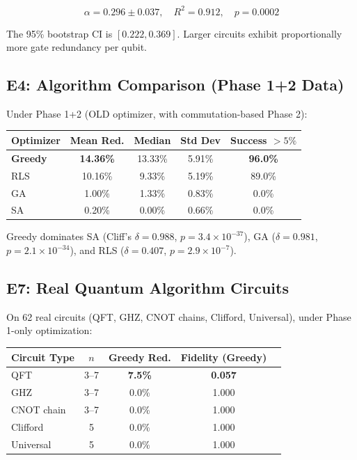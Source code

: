 \documentclass[aps,preprint,secnum,lined]{revtex4-2}
\begin{document}
\begin{equation}
\alpha = 0.296 \pm 0.037, \quad R^2 = 0.912, \quad p = 0.0002
\end{equation}

The 95\% bootstrap CI is $[0.222, 0.369]$. Larger circuits exhibit proportionally more gate redundancy per qubit.

\subsection{E4: Algorithm Comparison (Phase 1+2 Data)}
Under Phase 1+2 (OLD optimizer, with commutation-based Phase 2):

\begin{center}
\begin{tabular}{lcccc}
Optimizer & Mean Red. & Median & Std Dev & Success $>5\%$ \\ \hline
\textbf{Greedy} & \textbf{14.36\%} & 13.33\% & 5.91\% & \textbf{96.0\%} \\
RLS & 10.16\% & 9.33\% & 5.19\% & 89.0\% \\
GA & 1.00\% & 1.33\% & 0.83\% & 0.0\% \\
SA & 0.20\% & 0.00\% & 0.66\% & 0.0\%
\end{tabular}
\end{center}

Greedy dominates SA (Cliff's $\delta = 0.988$, $p = 3.4\times10^{-37}$), GA ($\delta = 0.981$, $p = 2.1\times10^{-34}$), and RLS ($\delta = 0.407$, $p = 2.9\times10^{-7}$).

\subsection{E7: Real Quantum Algorithm Circuits}
On 62 real circuits (QFT, GHZ, CNOT chains, Clifford, Universal), under Phase 1-only optimization:

\begin{center}
\begin{tabular}{lcccc}
Circuit Type & $n$ & Greedy Red. & Fidelity (Greedy) \\ \hline
QFT & 3--7 & \textbf{7.5\%} & \textbf{0.057} \\
GHZ & 3--7 & 0.0\% & 1.000 \\
CNOT chain & 3--7 & 0.0\% & 1.000 \\
Clifford & 5 & 0.0\% & 1.000 \\
Universal & 5 & 0.0\% & 1.000
\end{tabular}
\end{center}
\end{document}

